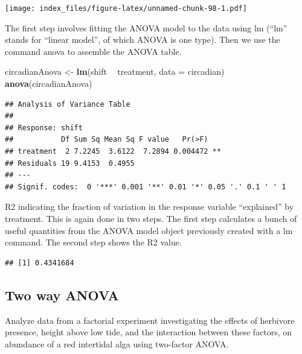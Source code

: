 \documentclass[]{article}
\newenvironment{Shaded}{\begin{snugshade}}{\end{snugshade}}
\newcommand{\DataTypeTok}[1]{\textcolor[rgb]{0.13,0.29,0.53}{#1}}
\newcommand{\KeywordTok}[1]{\textcolor[rgb]{0.13,0.29,0.53}{\textbf{#1}}}
\newcommand{\NormalTok}[1]{#1}
\newcommand{\OperatorTok}[1]{\textcolor[rgb]{0.81,0.36,0.00}{\textbf{#1}}}
\newcommand{\StringTok}[1]{\textcolor[rgb]{0.31,0.60,0.02}{#1}}
\begin{document}
\texttt{[image: index\_files/figure-latex/unnamed-chunk-98-1.pdf]}

The first step involves fitting the ANOVA model to the data using lm
(``lm'' stands for ``linear model'', of which ANOVA is one type). Then
we use the command anova to assemble the ANOVA table.

\begin{Shaded}
\begin{Highlighting}[]
\NormalTok{circadianAnova <-}\StringTok{ }\KeywordTok{lm}\NormalTok{(shift }\OperatorTok{~}\StringTok{ }\NormalTok{treatment, }\DataTypeTok{data =}\NormalTok{ circadian)}
\KeywordTok{anova}\NormalTok{(circadianAnova)}
\end{Highlighting}
\end{Shaded}

\begin{verbatim}
## Analysis of Variance Table
## 
## Response: shift
##           Df Sum Sq Mean Sq F value   Pr(>F)   
## treatment  2 7.2245  3.6122  7.2894 0.004472 **
## Residuals 19 9.4153  0.4955                    
## ---
## Signif. codes:  0 '***' 0.001 '**' 0.01 '*' 0.05 '.' 0.1 ' ' 1
\end{verbatim}

R2 indicating the fraction of variation in the response variable
``explained'' by treatment. This is again done in two steps. The first
step calculates a bunch of useful quantities from the ANOVA model object
previously created with a lm command. The second step shows the R2
value.

\begin{Shaded}
\end{Shaded}

\begin{verbatim}
## [1] 0.4341684
\end{verbatim}

\hypertarget{two-way-anova}{%
\subsection{Two way ANOVA}\label{two-way-anova}}

Analyze data from a factorial experiment investigating the effects of
herbivore presence, height above low tide, and the interaction between
these factors, on abundance of a red intertidal alga using two-factor
ANOVA.
\end{document}
